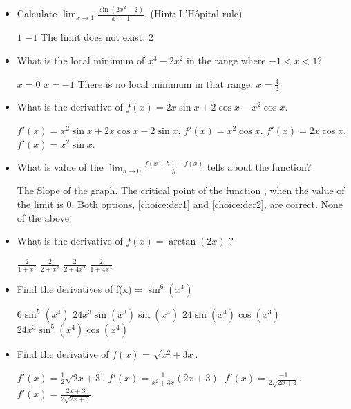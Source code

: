 \documentclass{exam}
\begin{document}
\begin{itemize}
	\item  Calculate $\lim_{x\to 1}\frac{\sin (2x^2-2)}{x^2-1}$. (Hint: L'H\^opital rule)

	\begin{choices}
		\choice   $1$
		\choice  $-1$
		\choice  The limit does not exist.
		\CorrectChoice  $2$
	\end{choices}
	\item What is the local minimum of $x^3-2x^2$ in the range where $-1<x<1$?

	\begin{choices}
		\choice  $x=0$
		\choice  $x=-1$
		\choice There is no local minimum in that range.
		\CorrectChoice  $x=\frac43$
	\end{choices}
	\item What is the derivative of $f(x) = 2x \sin x + 2 \cos x - x^{2}\cos x.$

	\begin{choices}
		\choice $f'(x) = x^{2} \sin x + 2 x \cos x -2\sin x$.
		\choice $f'(x) = x^{2}\cos x$.
		\choice $f'(x) = 2x\cos x$.
		\CorrectChoice $f'(x) = x^{2}\sin x$.
	\end{choices}

	\item What is value of the $\displaystyle \lim_{h \to 0} \frac{f(x+h) -f(x)}{h}$ tells about the function?

	\begin{choices}
		\choice\label{choice:der1} The Slope of the graph.
		\choice\label{choice:der2} The critical point of the function , when the value of the limit is 0.
		\CorrectChoice Both options, \ref{choice:der1} and \ref{choice:der2}, are correct.
		\choice None of the above.
	\end{choices}

	\item What is the derivative of $f(x) = \arctan(2x)$ ?

	\begin{choices}
		\choice $\frac{2}{1 + x^{2}}$
		\choice $\frac{2}{2 + x^{2}}$
		\choice $\frac{2}{2 + 4x^{2}}$
		\CorrectChoice $\frac{2}{1 + 4x^{2}}$
	\end{choices}
	\item Find the derivatives of f(x) = $\sin^6(x^4)$

	\begin{choices}
		\choice $6\sin^{5}(x^4)$
		\choice $24 x^{3}\sin(x^3) \sin(x^4)$
		\choice $24\sin(x^4)  \cos(x^3)$
		\CorrectChoice $24 x^{3} \sin^{5}(x^4)  \cos(x^4) $
	\end{choices}
	\item Find the derivative of $f(x)$ = $\sqrt{x^2+3x}$.

	\begin{choices}
		\choice $f'(x) = \frac{1}{2}\sqrt{2x+3}$.
		\choice $f'(x) = \frac{1}{x^2+3x}(2x+3)$.
		\choice $f'(x) = \frac{-1}{2 \sqrt{2x + 3}}$.
		\CorrectChoice $f'(x) = \frac{2x + 3}{2 \sqrt{2x + 3}}$.
	\end{choices}


\end{itemize}
\end{document}
